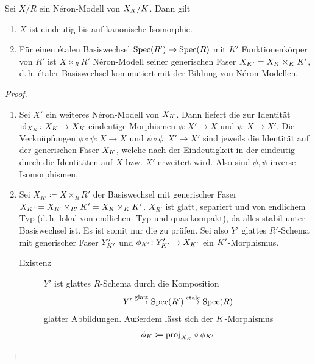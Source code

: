\documentclass[german]{scrreprt}
\begin{document}
\begin{Satz}
  Sei $X/R$ ein Néron-Modell von $X_{K}/K$. Dann gilt
  \begin{enumerate}[label=(\roman*)]
  \item $X$ ist eindeutig bis auf kanonische Isomorphie.
  \item Für einen étalen Basiswechsel $\operatorname{Spec}(R')\to\operatorname{Spec}(R)$ mit $K'$
    Funktionenkörper von $R'$ ist $X\times_R R'$ Néron-Modell
    seiner generischen Faser $X_{K'}=X_{K}\times_{K}K'$,
    d.\,h. étaler Basiswechsel kommutiert mit der Bildung von
    Néron-Modellen.
  \end{enumerate}
  \begin{proof}
    \begin{enumerate}[label=(\roman*)]
    \item Sei $X'$ ein weiteres Néron-Modell von $X_{K}$.
      Dann liefert die \NAbbEig zur Identität
      $\mathrm{id}_{X_{K}}\colon X_{K}\to X_{K}$ eindeutige Morphismen
      $\phi\colon X'\to X$ und $\psi\colon X\to X'$.
      Die Verknüpfungen $\phi\circ\psi\colon X\to X$ und
      $\psi\circ\phi\colon X'\to X'$ sind jeweils die Identität auf
      der generischen Faser $X_{K}$, welche nach der Eindeutigkeit in der
      \NAbbEig eindeutig durch die Identitäten auf
      $X$ bzw. $X'$ erweitert wird. Also sind $\phi,\psi$ inverse
      Isomorphismen.
    \item
      Sei $X_{R'}\coloneqq X\times_R R'$ der Basiswechsel
      mit generischer Faser
      $X_{K'}=X_{R'}\times_{R'}K'=X_{K}\times_{K}K'$.
      $X_{R'}$ ist glatt, separiert und von endlichem Typ 
      (d.\,h. lokal von endlichem Typ und quasikompakt), da alles
      stabil unter Basiswechsel ist. Es ist somit nur die
      \NAbbEig zu prüfen.
      Sei also $Y'$ glattes $R'$-Schema mit generischer Faser
      $Y_{K'}'$ und $\phi_{K'}\colon Y_{K'}'\to X_{K'}$ ein
      $K'$-Morphismus. 
      \begin{description}
      \item[Existenz] 
        $Y'$ ist glattes $R$-Schema durch die Komposition
        \begin{gather*}
          Y'\overset{\text{glatt}}{\longrightarrow}\operatorname{Spec}(R')
          \overset{\text{étale}}{\longrightarrow}\operatorname{Spec}(R)
        \end{gather*}
        glatter Abbildungen.
        Außerdem lässt sich der $K$-Morphismus
        \begin{gather*}
          \phi_{\K} \coloneqq \proj_{X_\K}\circ\phi_{\K'}

\end{gather*}
\end{description}
\end{enumerate}
\end{proof}
\end{Satz}
\end{document}
